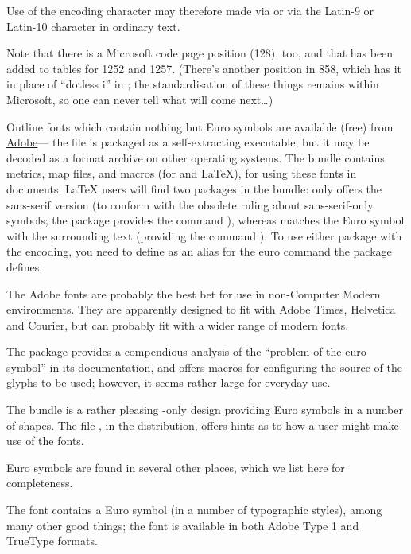 Use of the  encoding character may therefore made via
 or via the Latin-9 or Latin-10 character in ordinary
text.

Note that there is a Microsoft code page position (128), too, and that has
been added to  tables for 1252 and
1257.  (There's another position in 858, which has
it in place of ``dotless i'' in ; the standardisation of
these things remains within Microsoft, so one can never tell what will
come next\dots{})

Outline fonts which contain nothing but Euro symbols are available
(free) from
\href{ftp://ftp.adobe.com/pub/adobe/type/win/all/eurofont.exe}{Adobe}\nobreakspace---
the file is packaged as a  self-extracting
executable, but it may be decoded as a  format archive
on other operating systems.
The  bundle contains metrics,  map
files, and macros (for \plaintex{} and \LaTeX{}), for using these
fonts in documents.  \LaTeX{} users will find two packages in the
bundle:  only offers the sans-serif version (to
conform with the obsolete ruling about sans-serif-only symbols; the
package provides the
command ), whereas  matches the Euro symbol
with the surrounding text (providing the command ).  To use
either package
with the  encoding, you need to define 
as an alias for the euro command the package defines.

The Adobe fonts are probably the best bet for use in non-Computer
Modern environments.  They are apparently designed to fit with Adobe
Times, Helvetica and Courier, but can probably fit with a wider range
of modern fonts.

The  package provides a compendious analysis of the
``problem of the euro symbol'' in its documentation, and offers macros
for configuring the source of the glyphs to be used; however, it seems
rather large for everyday use.

The  bundle is a rather pleasing \MF{}-only design
providing Euro symbols in a number of shapes.  The file
, in the distribution, offers hints as to how a
\plaintex{} user might make use of the fonts.

Euro symbols are found in several other places, which we list here for
completeness.

The  font contains a Euro symbol (in a number of
typographic styles), among many other good things; the font is
available in both Adobe Type 1 and TrueType formats.

